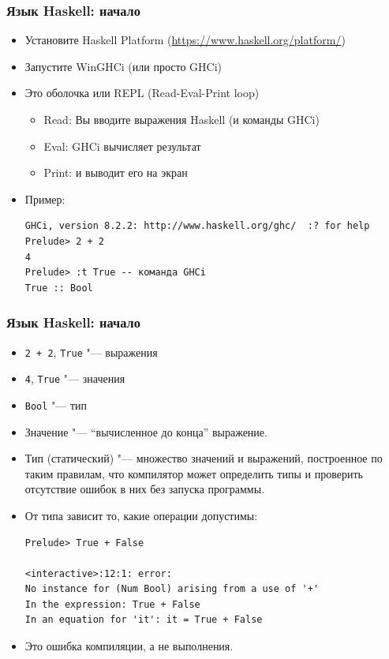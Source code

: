 \documentclass[10pt]{beamer}
\begin{document}
\begin{frame}[fragile]
\frametitle{Язык Haskell: начало}
\begin{itemize}
    \item Установите Haskell Platform (\url{https://www.haskell.org/platform/})
    \item Запустите WinGHCi (или просто GHCi)
    \item Это оболочка или REPL (Read-Eval-Print loop)
    \begin{itemize}
        \item Read: Вы вводите выражения Haskell (и команды GHCi)
        \item Eval: GHCi вычисляет результат
        \item Print: и выводит его на экран
    \end{itemize}
    \item Пример:
\begin{lstlisting}[breaklines]
GHCi, version 8.2.2: http://www.haskell.org/ghc/  :? for help
Prelude> 2 + 2
4
Prelude> :t True -- команда GHCi
True :: Bool
\end{lstlisting}
\end{itemize}
\end{frame}

\begin{frame}[fragile]
\frametitle{Язык Haskell: начало}
\begin{itemize}
    \item \lstinline|2 + 2|, \lstinline|True| "--- выражения
    \item \lstinline|4|, \lstinline|True| "--- значения
    \item \lstinline|Bool| "--- тип
    \pause
    \item Значение "--- \enquote{вычисленное до конца} выражение.
    \item Тип (статический) "--- множество значений и выражений, построенное по таким правилам, что компилятор может определить типы и проверить отсутствие ошибок в них без запуска программы.
    \item От типа зависит то, какие операции допустимы:
\begin{lstlisting}[basicstyle=\ttfamily\small]
Prelude> True + False

<interactive>:12:1: error:
No instance for (Num Bool) arising from a use of '+'
In the expression: True + False
In an equation for 'it': it = True + False
\end{lstlisting}
\item Это ошибка компиляции, а не выполнения.
\end{itemize}
\end{frame}
\end{document}
